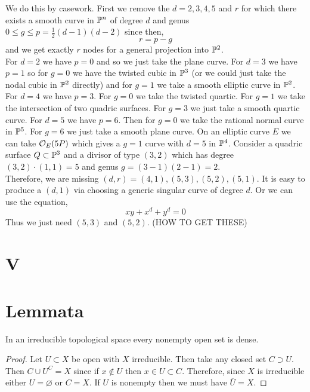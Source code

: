 \documentclass[12pt]{article}
\begin{document}
We do this by casework. First we remove the $d = 2,3,4,5$ and $r$ for which there exists a smooth curve in $\P^n$ of degree $d$ and genus $0 \le g \le p = \tfrac{1}{2}(d - 1)(d - 2)$ since then,
\[ r = p - g \]
and we get exactly $r$ nodes for a general projection into $\P^2$.
\bigskip\\
For $d = 2$ we have $p = 0$ and so we just take the plane curve. For $d = 3$ we have $p = 1$ so for $g = 0$ we have the twisted cubic in $\P^3$ (or we could just take the nodal cubic in $\P^2$ directly) and for $g = 1$ we take a smooth elliptic curve in $\P^2$. For $d = 4$ we have $p = 3$. For $g = 0$ we take the twisted quartic. For $g = 1$ we take the intersection of two quadric surfaces. For $g = 3$ we just take a smooth quartic curve. For $d = 5$ we have $p = 6$. Then for $g = 0$ we take the rational normal curve in $\P^5$. For $g = 6$ we just take a smooth plane curve. On an elliptic curve $E$ we can take $\struct{E}(5P)$ which gives a $g = 1$ curve with $d = 5$ in $\P^4$. Consider a quadric surface $Q \subset \P^3$ and a divisor of type $(3, 2)$ which has degree $(3, 2) \cdot (1,1) = 5$ and genus $g = (3-1)(2-1) = 2$. 
\bigskip\\
Therefore, we are missing $(d, r) = (4, 1), (5, 3), (5, 2), (5, 1)$. It is easy to produce a $(d, 1)$ via choosing a generic singular curve of degree $d$. Or we can use the equation,
\[ xy + x^d + y^d = 0 \]
Thus we just need $(5,3)$ and $(5,2)$. (HOW TO GET THESE)


\section{V}

\section{Lemmata}


\begin{lemma} \label{open_in_irreducible_is_dense}
In an irreducible topological space every nonempty open set is dense.
\end{lemma}

\begin{proof}
Let $U \subset X$ be open with $X$ irreducible. Then take any closed set $C \supset U$. Then $C \cup U^C = X$ since if $x \notin U$ then $x \in U \subset C$. Therefore, since $X$ is irreducible either $U = \varnothing$ or $C = X$. If $U$ is nonempty then we must have $\overline{U} = X$.  
\end{proof}
\end{document}
